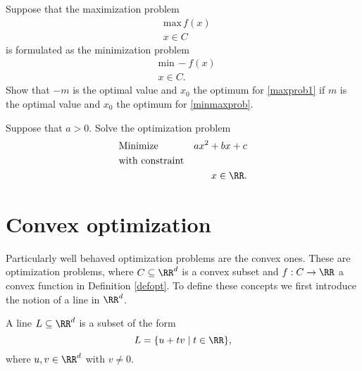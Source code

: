 \documentclass{article}
\begin{document}
\beginshex
Suppose that the maximization problem 
\begin{align}\label{maxprob1}
  &\text{max}\, f(x)\\
  &x\in C
\end{align}
is formulated as
the minimization problem
\begin{align}\label{minmaxprob}
  &\text{min}\, -f(x)\\
  &x\in C.
\end{align}
Show that $-m$ is the optimal value 
and $x_0$ the optimum for \eqref{maxprob1} if
$m$ is the optimal value 
and $x_0$ the optimum for \eqref{minmaxprob}. 
\endshex


    \beginshex\label{mothercopt}
    Suppose that $a > 0$. Solve the optimization problem
\begin{align*}
    &\text{Minimize} &a x^2 + b x + c\\
    &\text{with constraint}\\
    &&x\in \RR.
  \end{align*}
    
    \endshex

    \section{Convex optimization}

    Particularly well behaved optimization problems are the convex ones. These are optimization
    problems, where $C\subseteq \RR^d$ is a convex subset and $f:C\rightarrow \RR$ a
    convex function in Definition \ref{defopt}. To define these concepts we first introduce
    the notion of 
    a line in $\RR^d$.

    \begin{definition}[emph]\label{defline}
      A line $L\subseteq \RR^d$ is a subset of the form
      $$
      L = \{u + t v \mid t\in \RR\},
      $$
      where $u, v\in \RR^d$ with $v\neq 0$.
    \end{definition}
\end{document}
